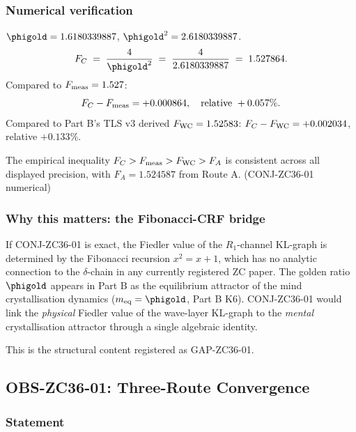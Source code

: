 \documentclass[12pt, a4paper]{article}
\begin{document}
\subsubsection{Numerical verification}

\begin{derivedbox}[title={CONJ-ZC36-01: Numerical verification}]
$\phigold = 1.6180339887$, $\phigold^2 = 2.6180339887$.
\[
  F_C \;=\; \frac{4}{\phigold^2}
  \;=\; \frac{4}{2.6180339887}
  \;=\; 1.527864.
\]
Compared to $F_{\rm meas} = 1.527$:
\[
  F_C - F_{\rm meas} = +0.000864,
  \quad\text{relative } +0.057\%.
\]
Compared to Part B's TLS v3 derived $F_{\rm WC} = 1.52583$:
$F_C - F_{\rm WC} = +0.002034$, relative $+0.133\%$.

The empirical inequality $F_C > F_{\rm meas} > F_{\rm WC} > F_A$
is consistent across all displayed precision, with
$F_A = 1.524587$ from Route A.
\hfill\textup{(CONJ-ZC36-01 numerical)}
\end{derivedbox}

\subsubsection{Why this matters: the Fibonacci-CRF bridge}

If CONJ-ZC36-01 is exact, the Fiedler value of the $R_1$-channel
KL-graph is determined by the Fibonacci recursion $x^2 = x + 1$,
which has no analytic connection to the $\delta$-chain in any
currently registered ZC paper. The golden ratio $\phigold$
appears in Part B as the equilibrium attractor of the mind
crystallisation dynamics ($m_{\rm eq} = \phigold$, Part B K6).
CONJ-ZC36-01 would link the \emph{physical} Fiedler value of
the wave-layer KL-graph to the \emph{mental} crystallisation
attractor through a single algebraic identity.

This is the structural content registered as GAP-ZC36-01.

\subsection{OBS-ZC36-01: Three-Route Convergence}
\label{sec:obs-zc36-01}

\subsubsection{Statement}
\end{document}

